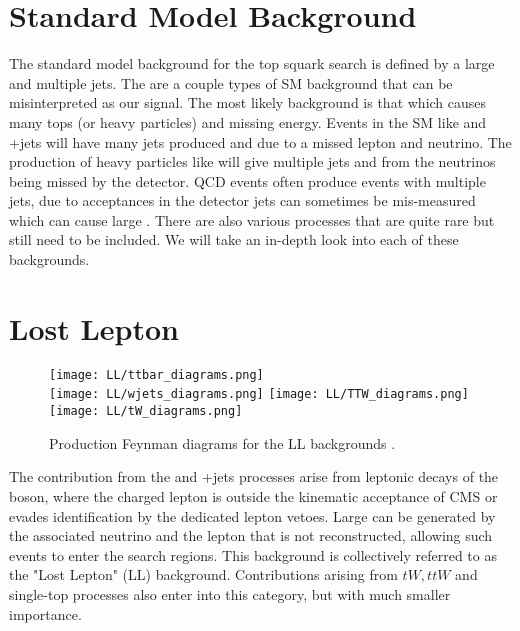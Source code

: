 \section{Standard Model Background}
\label{sec:SMBackground}

The standard model background for the top squark search is defined by a large \met{} and multiple jets. The are a couple types of SM background that can be misinterpreted as our signal. The most likely background is that which causes many tops (or heavy particles) and missing energy. Events in the SM like \ttbar{} and \W+jets will have many jets produced and \met{} due to a missed lepton and neutrino. The production of heavy particles like \Znunu{} will give multiple jets and \met{} from the neutrinos being missed by the detector. QCD events often produce events with multiple jets, due to acceptances in the detector jets can sometimes be mis-measured which can cause large \met{}. There are also various processes that are quite rare but still need to be included. We will take an in-depth look into each of these backgrounds. 

\section{Lost Lepton}
\label{sec:LL}

\begin{figure}
	\begin{center}
  \texttt{[image: LL/ttbar\_diagrams.png]}\\
  \texttt{[image: LL/wjets\_diagrams.png]}
  \texttt{[image: LL/TTW\_diagrams.png]} 
  \texttt{[image: LL/tW\_diagrams.png]} \\

	\caption[\ttbar{} Production]{Production Feynman diagrams for the LL backgrounds \cite{fiedler_precision_nodate, khachatryan_search_2016, aad_measurement_2013}. }
	\label{fig:llb-ttbar-diagram}
	\end{center}
\end{figure}

The contribution from the \ttbar{} and \W+jets processes arise from leptonic decays of the \W{} boson, where the charged lepton is outside the kinematic acceptance of CMS or evades identification by the dedicated lepton vetoes. Large \met{} can be generated by the associated neutrino and the lepton that is not reconstructed, allowing such events to enter the search regions. This background is collectively referred to as the "Lost Lepton" (LL) background. Contributions arising from $tW, ttW$ and single-top processes also enter into this category, but with much smaller importance. 

